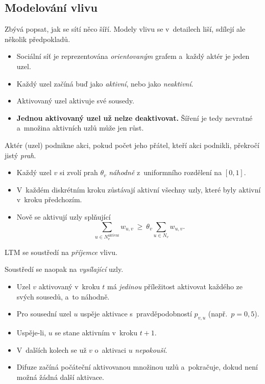 \documentclass[11pt,a4paper]{article}
\theoremstyle{definition}
\begin{document}
\subsection{Modelování vlivu}

Zbývá popsat, jak se sítí něco šíří. Modely vlivu se v~detailech liší, sdílejí ale několik
předpokladů.

\begin{defbox}
\begin{itemize}
\item Sociální síť je reprezentována \emph{orientovaným} grafem a~každý aktér je jeden uzel.
\item Každý uzel začíná buď jako \emph{aktivní}, nebo jako \emph{neaktivní}.
\item Aktivovaný uzel aktivuje své sousedy.
\item \textbf{Jednou aktivovaný uzel už nelze deaktivovat.} Šíření je tedy nevratné a~množina
      aktivních uzlů může jen růst.
\end{itemize}
\end{defbox}

\begin{defbox}
Aktér (uzel) podnikne akci, pokud počet jeho přátel, kteří akci podnikli, překročí jistý
\emph{prah}.
\begin{itemize}
\item Každý uzel $v$ si zvolí prah $\theta_v$ \emph{náhodně} z~uniformního rozdělení na
      $[0,1]$.
\item V~každém diskrétním kroku zůstávají aktivní všechny uzly, které byly aktivní v~kroku
      předchozím.
\item Nově se aktivují uzly splňující
      \[ \sum_{u\in N_v^{\text{aktivní}}} w_{u,v}\ \ge\ \theta_v
         \sum_{u\in N_v} w_{u,v}. \]
\end{itemize}
LTM se soustředí na \emph{příjemce} vlivu.
\end{defbox}

\begin{defbox}
Soustředí se naopak na \emph{vysílající} uzly.
\begin{itemize}
\item Uzel $v$ aktivovaný v~kroku $t$ má \emph{jedinou} příležitost aktivovat každého ze svých
      sousedů, a~to náhodně.
\item Pro sousední uzel $u$ uspěje aktivace s~pravděpodobností $p_{v,u}$ (např.\ $p=0{,}5$).
\item Uspěje-li, $u$ se stane aktivním v~kroku $t+1$.
\item V~dalších kolech se už $v$ o~aktivaci $u$ \emph{nepokouší}.
\item Difuze začíná počáteční aktivovanou množinou uzlů a~pokračuje, dokud není možná žádná
      další aktivace.
\end{itemize}
\end{defbox}
\end{document}
